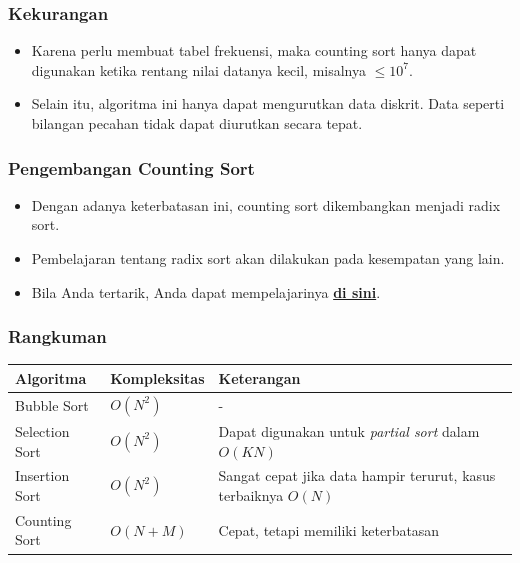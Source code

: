 \begin{frame}
\frametitle{Kekurangan}
  \begin{itemize}
    \item Karena perlu membuat tabel frekuensi, maka counting sort hanya dapat digunakan ketika rentang nilai datanya kecil, misalnya $\le 10^7$.
    \item Selain itu, algoritma ini hanya dapat mengurutkan data diskrit. Data seperti bilangan pecahan tidak dapat diurutkan secara tepat.
  \end{itemize}
\end{frame}

\begin{frame}
\frametitle{Pengembangan Counting Sort}
  \begin{itemize}
    \item Dengan adanya keterbatasan ini, counting sort dikembangkan
    menjadi radix sort.
    \item Pembelajaran tentang radix sort akan dilakukan pada
    kesempatan yang lain.
    \item Bila Anda tertarik, Anda dapat mempelajarinya \href{https://en.wikipedia.org/wiki/Radix_sort}{\textbf{di sini}}.
  \end{itemize}
\end{frame}

\begin{frame}
\frametitle{Rangkuman}
    \begin{table}[ht]
      \begin{tabular}{|l|l|p{5 cm}|}
        \hline Algoritma  & Kompleksitas & Keterangan \\
        \hline Bubble Sort & $O(N^2)$ & - \\
        \hline Selection Sort & $O(N^2)$ & Dapat digunakan untuk \textit{partial sort} dalam $O(KN)$ \\
        \hline Insertion Sort & $O(N^2)$ & Sangat cepat jika data hampir terurut, kasus terbaiknya $O(N)$ \\
        \hline Counting Sort & $O(N+M)$ & Cepat, tetapi memiliki keterbatasan \\
        \hline
      \end{tabular}
    \end{table}
\end{frame}


